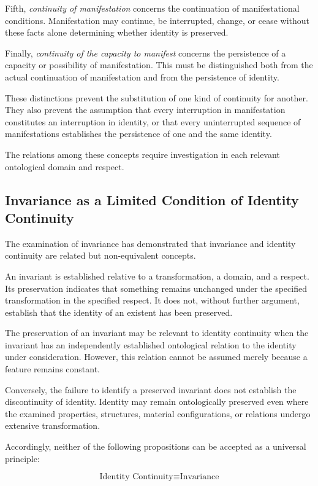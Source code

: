 Fifth, \emph{continuity of manifestation} concerns the continuation of
manifestational conditions. Manifestation may continue, be interrupted, change,
or cease without these facts alone determining whether identity is preserved.

Finally, \emph{continuity of the capacity to manifest} concerns the persistence
of a capacity or possibility of manifestation. This must be distinguished both
from the actual continuation of manifestation and from the persistence of
identity.

These distinctions prevent the substitution of one kind of continuity for
another. They also prevent the assumption that every interruption in
manifestation constitutes an interruption in identity, or that every
uninterrupted sequence of manifestations establishes the persistence of one
and the same identity.

The relations among these concepts require investigation in each relevant
ontological domain and respect.

\subsection{Invariance as a Limited Condition of Identity Continuity}

The examination of invariance has demonstrated that invariance and identity
continuity are related but non-equivalent concepts.

An invariant is established relative to a transformation, a domain, and a
respect. Its preservation indicates that something remains unchanged under
the specified transformation in the specified respect. It does not, without
further argument, establish that the identity of an existent has been
preserved.

The preservation of an invariant may be relevant to identity continuity when
the invariant has an independently established ontological relation to the
identity under consideration. However, this relation cannot be assumed merely
because a feature remains constant.

Conversely, the failure to identify a preserved invariant does not establish
the discontinuity of identity. Identity may remain ontologically preserved
even where the examined properties, structures, material configurations, or
relations undergo extensive transformation.

Accordingly, neither of the following propositions can be accepted as a
universal principle:

\[
\text{Identity Continuity}
\equiv
\text{Invariance}
\]

